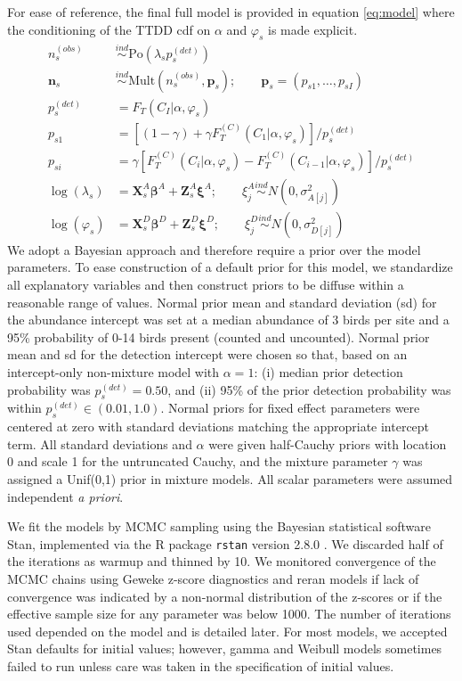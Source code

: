 \documentclass[12pt]{article}
\newcommand{\vn}{\textbf{n}}
\newcommand{\vp}{\textbf{p}}
\newcommand{\vX}{\textbf{X}}
\newcommand{\vZ}{\textbf{Z}}
\newcommand{\vbeta}{\boldsymbol{\beta}}
\newcommand{\vxi}{\boldsymbol{\xi}}
\newcommand{\Po}{\mbox{Po}}
\newcommand{\Mult}{\mbox{Mult}}
\newcommand{\pdet}{p^{(det)}}
\newcommand{\ind}{\stackrel{ind}{\sim}}
\newcommand{\Fm}{F_T^{(C)}}
\newcommand{\nobs}{n^{(obs)}}
\begin{document}
For ease of reference, the final full model is provided in equation \eqref{eq:model} where the conditioning of the TTDD cdf on $\alpha$ and $\varphi_s$ is made explicit.
\begin{align}
\nobs_s &\ind \Po(\lambda_s \pdet_s) \nonumber\\
\vn_s &\ind \Mult(\nobs_s, \vp_s); \qquad \vp_s = (p_{s1},\dots,p_{sI}) \nonumber\\
\pdet_s &= F_T(C_I|\alpha,\varphi_s) \nonumber \\
p_{s1} &= \left[(1-\gamma) + \gamma\Fm(C_1|\alpha,\varphi_s)\right]/\pdet_s \label{eq:model} \\
p_{si} &= \gamma\left[\Fm(C_i|\alpha,\varphi_s) - \Fm(C_{i-1}|\alpha,\varphi_s)\right]/\pdet_s \nonumber\\
\log(\lambda_s) &= \vX_{s}^A\vbeta^A + \vZ_{s}^A\vxi^A; \qquad \xi_j^A \ind N(0,\sigma_{A[j]}^2) \nonumber\\
\log(\varphi_{s}) &= \vX_{s}^D\vbeta^D + \vZ_{s}^D\vxi^D; \qquad \xi_j^D \ind N(0,\sigma_{D[j]}^2) \nonumber
\end{align}
We adopt a Bayesian approach and therefore require a prior over the model parameters.
To ease construction of a default prior for this model, we standardize all explanatory variables and then construct priors to be diffuse within a reasonable range of values.
Normal prior mean and standard deviation (sd) for the abundance intercept was set at a median abundance of 3 birds per site and a 95\% probability of 0-14 birds present (counted and uncounted).  
Normal prior mean and sd for the detection intercept were chosen so that, based on an intercept-only non-mixture model with $\alpha=1$: (i) median prior detection probability was $p_{s}^{(det)} = 0.50$, and (ii) 95\% of the prior detection probability was within $p_{s}^{(det)} \in (0.01, 1.0)$.  
Normal priors for fixed effect parameters were centered at zero with standard deviations matching the appropriate intercept term.  
All standard deviations and $\alpha$ were given half-Cauchy priors with location 0 and scale 1 for the untruncated Cauchy, and the mixture parameter $\gamma$ was assigned a Unif(0,1) prior in mixture models.
All scalar parameters were assumed independent \emph{a priori}. 



We fit the models by MCMC sampling using the Bayesian statistical software Stan, implemented via the R package \texttt{rstan} version 2.8.0 \citep{Rstan2016}.  
We discarded half of the iterations as warmup and thinned by 10.  
We monitored convergence of the MCMC chains using Geweke z-score diagnostics \citep{Geweke1991} and reran models if lack of convergence was indicated by a non-normal distribution of the z-scores or if the effective sample size for any parameter was below 1000.  
The number of iterations used depended on the model and is detailed later. 
For most models, we accepted Stan defaults for initial values; however, gamma and Weibull models sometimes failed to run unless care was taken in the specification of initial values.
\end{document}
